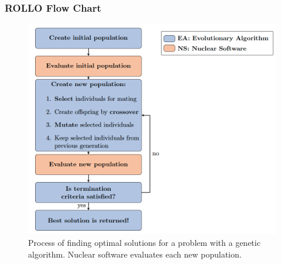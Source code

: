 \begin{frame}
    \frametitle{ROLLO Flow Chart}
    \begin{figure}
        \begin{minipage}[c]{0.3\textwidth}
        \caption{Process of finding optimal solutions for a problem with a 
        genetic algorithm. Nuclear software evaluates each new population.}
        \end{minipage}\hfill
        \begin{minipage}[c]{0.7\textwidth}
        \includegraphics[width=\linewidth]{figures/rollo-flow.png} 
        \end{minipage}
    \end{figure}
\end{frame}